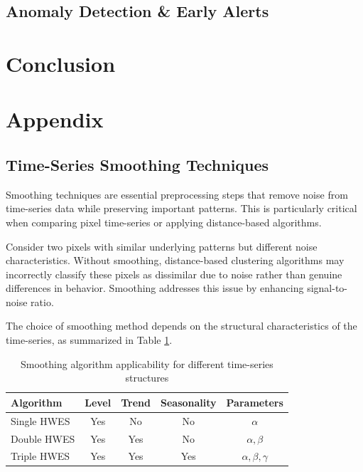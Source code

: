 \documentclass{article} %
\begin{document}
        \subsection{Anomaly Detection \& Early Alerts}


\section{Conclusion}

\clearpage


\clearpage

\appendix
{}

\section{Appendix}
\subsection{Time-Series Smoothing Techniques}

        Smoothing techniques are essential preprocessing steps that remove noise from time-series data while preserving important patterns. This is particularly critical when comparing pixel time-series or applying distance-based algorithms.

        Consider two pixels with similar underlying patterns but different noise characteristics. Without smoothing, distance-based clustering algorithms may incorrectly classify these pixels as dissimilar due to noise rather than genuine differences in behavior. Smoothing addresses this issue by enhancing signal-to-noise ratio.

        The choice of smoothing method depends on the structural characteristics of the time-series, as summarized in Table \ref{tab:t1}.

        \begin{table}[h]
        \centering
        \caption{Smoothing algorithm applicability for different time-series structures}
        \label{tab:t1}
        \renewcommand{\arraystretch}{1.3}
            \begin{tabular}{|l|c|c|c|c|}
            \hline
            \textbf{Algorithm} & \textbf{Level} & \textbf{Trend} & \textbf{Seasonality} & \textbf{Parameters} \\
            \hline
            Single HWES  & Yes & No  & No  & $\alpha$ \\
            Double HWES  & Yes & Yes & No  & $\alpha, \beta$ \\
            Triple HWES  & Yes & Yes & Yes & $\alpha, \beta, \gamma$ \\
            \hline
            \end{tabular}
        \end{table}
\end{document}
